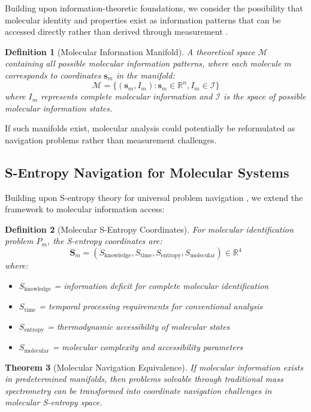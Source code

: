 \documentclass[11pt,a4paper]{article}
\newtheorem{theorem}{Theorem}[section]
\newtheorem{definition}[theorem]{Definition}
\theoremstyle{remark}
\begin{document}
Building upon information-theoretic foundations, we consider the possibility that molecular identity and properties exist as information patterns that can be accessed directly rather than derived through measurement \cite{wheeler1989information,lloyd2006programming}.

\begin{definition}[Molecular Information Manifold]
A theoretical space $\mathcal{M}$ containing all possible molecular information patterns, where each molecule $m$ corresponds to coordinates $\mathbf{s}_m$ in the manifold:
$$\mathcal{M} = \{(\mathbf{s}_m, I_m) : \mathbf{s}_m \in \mathbb{R}^n, I_m \in \mathcal{I}\}$$
where $I_m$ represents complete molecular information and $\mathcal{I}$ is the space of possible molecular information states.
\end{definition}

If such manifolds exist, molecular analysis could potentially be reformulated as navigation problems rather than measurement challenges.

\subsection{S-Entropy Navigation for Molecular Systems}

Building upon S-entropy theory for universal problem navigation \cite{sachikonye2024sentropy}, we extend the framework to molecular information access:

\begin{definition}[Molecular S-Entropy Coordinates]
For molecular identification problem $P_m$, the S-entropy coordinates are:
$$\mathbf{S}_m = (S_{\text{knowledge}}, S_{\text{time}}, S_{\text{entropy}}, S_{\text{molecular}}) \in \mathbb{R}^4$$
where:
\begin{itemize}
\item $S_{\text{knowledge}}$ = information deficit for complete molecular identification
\item $S_{\text{time}}$ = temporal processing requirements for conventional analysis
\item $S_{\text{entropy}}$ = thermodynamic accessibility of molecular states
\item $S_{\text{molecular}}$ = molecular complexity and accessibility parameters
\end{itemize}
\end{definition}

\begin{theorem}[Molecular Navigation Equivalence]
If molecular information exists in predetermined manifolds, then problems solvable through traditional mass spectrometry can be transformed into coordinate navigation challenges in molecular S-entropy space.
\end{theorem}
\end{document}
